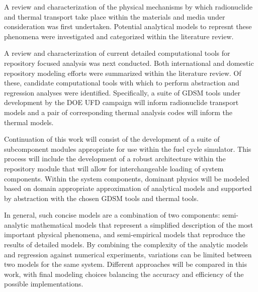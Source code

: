 
A review and characterization of the physical mechanisms by which radionuclide 
and thermal transport take place within the materials and media under 
consideration was first undertaken. Potential analytical models to represnt  
these phenomena were investigated and categorized within the literature review. 


A review and characterization of current detailed computational tools for
repository focused analysis was next conducted. Both international and domestic
repository modeling efforts were summarized within the literature review. Of 
these, candidate computational tools with which to perform abstraction and 
regression analyses were identified. Specifically, a suite of \gls{GDSM} tools 
under development by the \gls{DOE} \gls{UFD} campaign will inform  radionuclide 
transport models and a pair of corresponding thermal analysis codes will inform 
the thermal models.
 

Continuation of this work will consist of the development of a suite of 
subcomponent modules appropriate for use within the \Cyclus fuel cycle 
simulator.  This process will include the development of a robust architecture 
within the repository module that will allow for interchangeable loading of 
system components.  Within the system components, dominant physics will be 
modeled based on domain appropriate approximation of analytical models and 
supported by abstraction with the chosen \gls{GDSM} tools and thermal tools. 


In general, such concise models are a combination of two components: 
semi-analytic mathematical models that represent a simplified description of the 
most important physical phenomena, and semi-empirical models that reproduce the 
results of detailed models.  By combining the complexity of the analytic models 
and regression against numerical experiments, variations can be limited between 
two models for the same system.  Different approaches will be compared in this 
work, with final modeling choices balancing the accuracy and efficiency of the 
possible implementations.  


